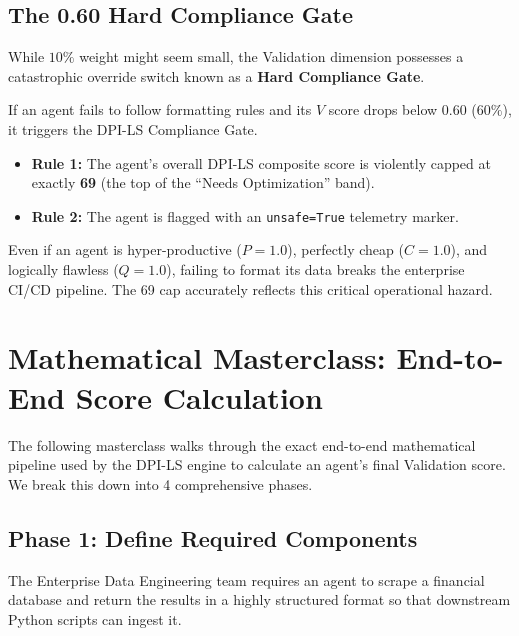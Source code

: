 \documentclass[11pt,a4paper]{article}
\begin{document}
\subsection{The 0.60 Hard Compliance Gate}

While $10\%$ weight might seem small, the Validation dimension possesses a catastrophic override switch known as a \textbf{Hard Compliance Gate}.

If an agent fails to follow formatting rules and its $V$ score drops below $\mathbf{0.60}$ ($60\%$), it triggers the DPI-LS Compliance Gate. 
\begin{itemize}
    \item \textbf{Rule 1:} The agent's overall DPI-LS composite score is violently capped at exactly \textbf{69} (the top of the ``Needs Optimization'' band).
    \item \textbf{Rule 2:} The agent is flagged with an \texttt{unsafe=True} telemetry marker.
\end{itemize}

Even if an agent is hyper-productive ($P=1.0$), perfectly cheap ($C=1.0$), and logically flawless ($Q=1.0$), failing to format its data breaks the enterprise CI/CD pipeline. The 69 cap accurately reflects this critical operational hazard.

\newpage

\section{Mathematical Masterclass: End-to-End Score Calculation}

The following masterclass walks through the exact end-to-end mathematical pipeline used by the DPI-LS engine to calculate an agent's final Validation score. We break this down into 4 comprehensive phases.

\vspace{0.5cm}

\subsection{Phase 1: Define Required Components}

The Enterprise Data Engineering team requires an agent to scrape a financial database and return the results in a highly structured format so that downstream Python scripts can ingest it.
\end{document}
